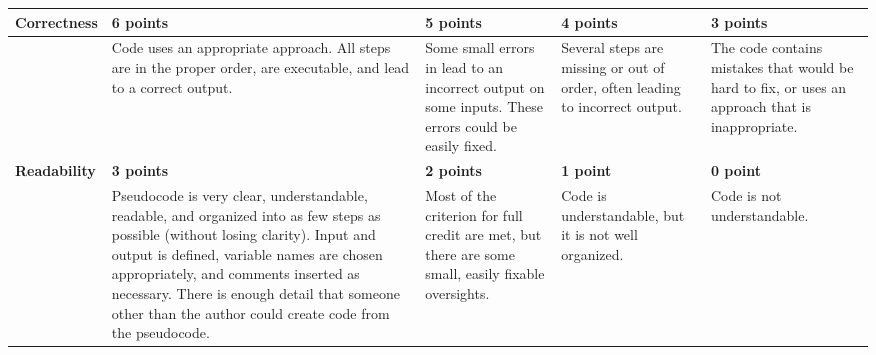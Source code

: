 \documentclass[12pt,landscape]{article}
\begin{document}
{\renewcommand{\arraystretch}{2}
\begin{tabular}{|p{2.3cm}|p{6cm}|p{4.2cm}|p{4.2cm}|p{4.2cm}|}
\hline
{\bf Correctness }& {\bf 6 points} & {\bf 5 points} & {\bf 4 points}& {\bf 3 points} \\
\hline
&Code uses an appropriate approach. All steps are in the proper order, are executable, and lead to a correct output.& Some small errors in lead to an incorrect output on some inputs. These errors could be easily fixed. & 
Several steps are missing or out of order, often leading to incorrect output.& The code contains mistakes that would be hard to fix, or uses an approach that is inappropriate.\\
\hline
{\bf Readability }& {\bf 3 points} & {\bf 2 points} & {\bf 1 point}& {\bf 0 point} \\
\hline
& 
 Pseudocode is very clear, understandable, readable, and organized into as few steps as possible (without losing clarity). Input and output is defined, variable names are chosen appropriately, and comments inserted as necessary. There is enough detail that someone other than the author could create code from the pseudocode.& 
 Most of the criterion for full credit are met, but there are some small, easily fixable oversights. & Code is understandable, but it is not well organized. & 
 Code is not understandable.\\
 \hline

 \end{tabular}
}
\end{document}
